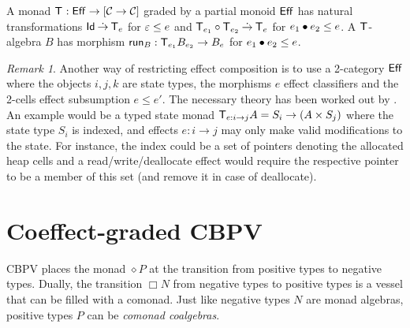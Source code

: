 \documentclass[acmsmall,review,anonymous]{acmart}\settopmatter{printfolios=true,printccs=false,printacmref=false}
\newcommand{\graybox}[1]{\grayboxtext{$#1$}}
\theoremstyle{remark}
\newtheorem{remark}{Remark}
\begin{document}
A monad $\T : \Eff \to [\CC \to \CC]$ graded by a partial monoid
$\Eff$ has natural transformations $\Id \todot \T[e]$ for $\Ge \leq e$
and $\T[e_1] \circ \T[e_2] \todot \T[e]$ for $e_1 \bu e_2 \leq e$.  A
$\T$-algebra $B$ has morphism $\run[B] : \T[e_1]B_{e_2} \to B_{e}$
for $e_1 \bu e_2 \leq e$.

\begin{remark}
Another way of restricting effect composition is to use a 2-category
$\Eff$ where the objects $i,j,k$ are state types, the morphisms $e$
effect classifiers and the 2-cells effect subsumption $e \leq e'$.
The necessary theory has been worked out by
\citet{orchardWadlerEades:msfp20}.
%
An example would be a typed state monad
$\T[e: i \to j] A = S_i \to (A \times S_j)$ where the state type $S_i$
is indexed, and effects $e : i \to j$ may only make valid
modifications to the state.
%
For instance, the index could be a set of pointers denoting the
allocated heap cells and a read/write/deallocate effect would require
the respective pointer to be a member of this set (and remove it in
case of deallocate).
\end{remark}


\section{Coeffect-graded CBPV}
\label{sec:coeff}

\newcommand{\lolli}{\multimap}
\newcommand{\qfun}[3]{#1#2 \lolli #3}
\newcommand{\gqfun}[3]{\graybox{#1#2 \lolli #3}}
\newcommand{\nbox}[1]{}
\newcommand{\tzip}{\mathsf{zip}}
\newcommand{\textract}{\mathsf{extract}}
\newcommand{\extract}[1][]{\textract_{#1}}
\newcommand{\tdisplay}{\mathsf{display}}
\newcommand{\display}[1][]{\tdisplay_{#1}}
\newcommand{\tduplicate}{\mathsf{duplicate}}
\newcommand{\duplicate}[1][]{\tduplicate_{#1}}
\newcommand{\tcobind}{\mathsf{cobind}}
\newcommand{\tbind}{\mathsf{bind}}
\newcommand{\tget}{\mathsf{get}}
\newcommand{\tmodify}{\mathsf{modify}}
\newcommand{\thead}{\mathsf{head}}
\newcommand{\ttail}{\mathsf{tail}}
\newcommand{\suc}{(\_{+}1)}
\newcommand{\Float}{\mathsf{Float}}
\newcommand{\tiso}{\mathsf{iso}}
\newcommand{\isot}{\tiso^\otimes}

CBPV places the monad $\diamond P$ at the transition from positive
types to negative types.  Dually, the transition $\Box N$ from
negative types to positive types is a vessel that can be filled with a
comonad.  Just like negative types $N$ are monad algebras, positive
types $P$ can be \emph{comonad coalgebras}.
\end{document}
